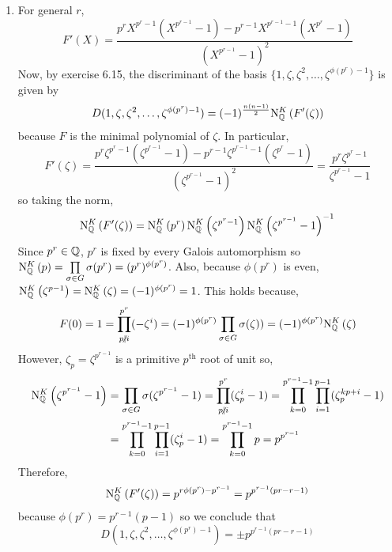 \documentclass[12pt]{extarticle}
\begin{document}
\begin{enumerate}
\begin{enumerate}
\item For general $r$, \[F'(X) = \frac{p^r X^{p^r - 1} (X^{p^{r-1}} - 1) - p^{r-1} X^{p^{r-1} - 1} (X^{p^r} - 1)}{(X^{p^{r-1}} - 1)^2}\] 
Now, by exercise 6.15, the discriminant of the basis $\{1, \zeta, \zeta^2, \dots,\zeta^{\phi(p^r)-1} \}$ is given by \[D(1, \zeta, \zeta^2, \dots,\zeta^{\phi(p^r)-1}) = (-1)^{\frac{n(n-1)}{2}} \mathrm{N}^{K}_{\mathbb{Q}}\left(F'(\zeta)\right)\] because $F$ is the minimal polynomial of $\zeta$. In particular,
 \[F'(\zeta) = \frac{p^r \zeta^{p^r - 1} (\zeta^{p^{r-1}} - 1) - p^{r-1} \zeta^{p^{r-1} - 1} (\zeta^{p^r} - 1)}{(\zeta^{p^{r-1}} - 1)^2} = \frac{p^r \zeta^{p^r - 1}}{\zeta^{p^{r-1}} - 1}\]
so taking the norm, \[\mathrm{N}^{K}_{\mathbb{Q}}\left(F'(\zeta)\right) = \mathrm{N}^{K}_{\mathbb{Q}}\left(p^r\right) \mathrm{N}^{K}_{\mathbb{Q}}\left(\zeta^{p^r-1}\right) \mathrm{N}^{K}_{\mathbb{Q}}\left(\zeta^{p^{r-1}} - 1\right)^{-1}\]
Since $p^r \in \mathbb{Q}$, $p^r$ is fixed by every Galois automorphism so $\mathrm{N}^{K}_{\mathbb{Q}}\left(p\right) = \prod\limits_{\sigma \in G} \sigma(p^r) =  (p^r)^{\phi(p^r)}$. Also, because $\phi(p^r)$ is even, $\mathrm{N}^{K}_{\mathbb{Q}}\left(\zeta^{p-1}\right) = \mathrm{N}^{K}_{\mathbb{Q}}\left(\zeta\right) = (-1)^{\phi(p^r)} = 1$. This holds because,
\[F(0) = 1 = \prod_{p \ndivides i}^{p^r} (-\zeta^i) = (-1)^{\phi(p^r)} \prod_{\sigma \in G} \sigma(\zeta)) = (-1)^{\phi(p^r)} \qnorm{K}{\zeta}\]
However, $\zeta_p = \zeta^{p^{r-1}}$ is a primitive $p^{\text{th}}$ root of unit so, \begin{align*}
\qnorm{K}{\zeta^{p^{r-1}} - 1} & = \prod_{\sigma \in G} \sigma(\zeta^{p^{r-1}} - 1) = \prod_{p \ndivides i}^{p^r} (\zeta_p^i - 1) = \prod_{k = 0}^{p^{r-1} - 1} \prod_{i = 1}^{p-1} (\zeta_p^{kp + i} - 1) \\ & = \prod_{k = 0}^{p^{r-1} - 1} \prod_{i = 1}^{p-1} (\zeta_p^{i} - 1)   = \prod_{k = 0}^{p^{r-1} - 1} p = p^{p^{r-1}}
\end{align*}
Therefore, \[\mathrm{N}^{K}_{\mathbb{Q}}\left(F'(\zeta)\right) = p^{r \phi(p^r) - p^{r-1}} = p^{p^{r-1}(pr - r - 1)}\] because $\phi(p^r) = p^{r-1}(p-1)$ so we conclude that \[D(1, \zeta, \zeta^2, \dots,\zeta^{\phi(p^r)-1}) = \pm p^{p^{r-1}(pr - r - 1)}\]
\end{enumerate}
\end{enumerate}
\end{document}
